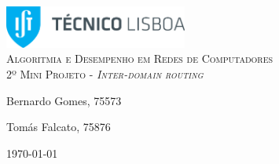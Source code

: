 \begin{titlepage}

	\begin{center}

		\includegraphics[width=6cm]{./title}\\[3cm]

		\textsc{\LARGE Algoritmia e Desempenho em Redes de Computadores}\\[1.5cm]

		\textsc{\Large 2º Mini Projeto - \textit{Inter-domain routing}}\\[1.5cm]


		


		\noindent
		\begin{minipage}{0.4\textwidth}
			\begin{flushleft} \large
				Bernardo Gomes, 75573
			\end{flushleft}
		\end{minipage}
		\begin{minipage}{0.4\textwidth}
			\begin{flushright} \large
				Tomás Falcato, 75876
			\end{flushright}
		\end{minipage}

		\vfill

		{\large \today}


	\end{center}

\end{titlepage}
